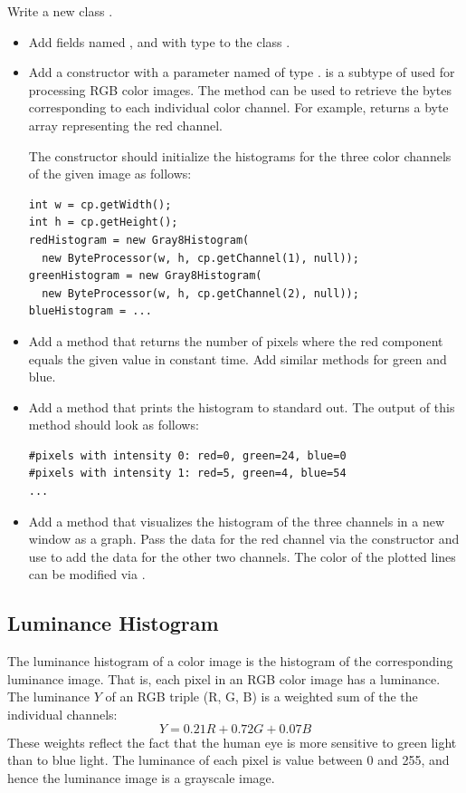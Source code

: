 \documentclass{book}
\begin{document}
\begin{exercise}
Write a new class .
\begin{itemize}
  \item  Add fields named ,  and  with type  to the class .
  \item Add a constructor with a parameter named  of type .  is a subtype of  used for processing RGB color images. The method  can be used to retrieve the bytes corresponding to each individual color channel. For example,  returns a byte array representing the red channel.
  
 The constructor should initialize the histograms for the three color channels of the given image as follows:
  \begin{lstlisting}
int w = cp.getWidth();
int h = cp.getHeight();
redHistogram = new Gray8Histogram(
  new ByteProcessor(w, h, cp.getChannel(1), null));
greenHistogram = new Gray8Histogram(
  new ByteProcessor(w, h, cp.getChannel(2), null));
blueHistogram = ...
  \end{lstlisting}
   \item Add a method  that returns the number of pixels where the red component equals the given value in constant time. Add similar methods for green and blue.
  \item Add a method  that prints the histogram to standard out. The output of this method should look as follows:
\begin{verbatim}
#pixels with intensity 0: red=0, green=24, blue=0  
#pixels with intensity 1: red=5, green=4, blue=54 
...
\end{verbatim}
 \item Add a method  that visualizes the histogram of the three channels in a new window as a graph. Pass the data for the red channel via the constructor and use  to add the data for the other two channels. The color of the plotted lines can be modified via . 
\end{itemize}
\end{exercise}

\subsection{Luminance Histogram}
The luminance histogram of a color image is the histogram of the corresponding luminance image. That is, each pixel in an RGB color image has a luminance. The luminance $Y$ of an RGB triple (R, G, B) is a weighted sum of the the individual channels:
$$Y =  0.21 R + 0.72 G + 0.07 B$$
These weights reflect the fact that the human eye is more sensitive to green light than to blue light. The luminance of each pixel is value between 0 and 255, and hence the luminance image is a grayscale image.
\end{document}
